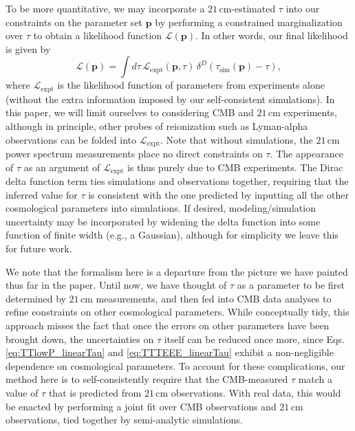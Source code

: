 \documentclass[twocolumn,aps,prd,nofootinbib,showpacs,superscriptaddress]{revtex4-1}
\begin{document}
To be more quantitative, we may incorporate a $21\,\textrm{cm}$-estimated $\tau$ into our constraints on the parameter set $\mathbf{p}$ by performing a constrained marginalization over $\tau$ to obtain a likelihood function $\mathcal{L} (\mathbf{p})$. In other words, our final likelihood is given by
\begin{equation}
\label{eq:ConstrainedOptimization}
\mathcal{L} (\mathbf{p}) = \int d\tau \, \mathcal{L}_\textrm{expt} ( \mathbf{p}, \tau) \, \delta^D \!\!\left( \tau_\textrm{sim} (\mathbf{p}) - \tau \right),
\end{equation}
where $\mathcal{L}_\textrm{expt}$ is the likelihood function of parameters from experiments alone (without the extra information imposed by our self-consistent simulations). In this paper, we will limit ourselves to considering CMB and $21\,\textrm{cm}$ experiments, although in principle, other probes of reionization such as Lyman-alpha observations can be folded into $\mathcal{L}_\textrm{expt}$. Note that without simulations, the $21\,\textrm{cm}$ power spectrum measurements place no direct constraints on $\tau$. The appearance of $\tau$ as an argument of $\mathcal{L}_\textrm{expt}$ is thus purely due to CMB experiments. The Dirac delta function term ties simulations and observations together, requiring that the inferred value for $\tau$ is consistent with the one predicted by inputting all the other cosmological parameters into simulations. If desired, modeling/simulation uncertainty may be incorporated by widening the delta function into some function of finite width (e.g., a Gaussian), although for simplicity we leave this for future work.

We note that the formalism here is a departure from the picture we have painted thus far in the paper. Until now, we have thought of $\tau$ as a parameter to be first determined by $21\,\textrm{cm}$ measurements, and then fed into CMB data analyses to refine constraints on other cosmological parameters. While conceptually tidy, this approach misses the fact that once the errors on other parameters have been brought down, the uncertainties on $\tau$ itself can be reduced once more, since Eqs. \eqref{eq:TTlowP_linearTau} and \eqref{eq:TTTEEE_linearTau} exhibit a non-negligible dependence on cosmological parameters. To account for these complications, our method here is to self-consistently require that the CMB-measured $\tau$ match a value of $\tau$ that is predicted from $21\,\textrm{cm}$ observations. With real data, this would be enacted by performing a joint fit over CMB observations and $21\,\textrm{cm}$ observations, tied together by semi-analytic simulations.
\end{document}
